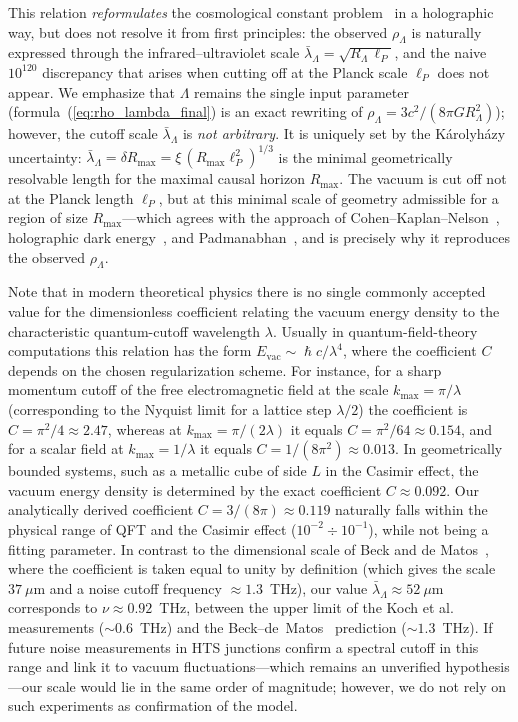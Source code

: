 \documentclass[10pt,a4paper]{article}
\DeclareRobustCommand{\hbar}{\hslash}
\begin{document}
This relation \emph{reformulates} the cosmological constant problem~\cite{Weinberg1989} in a holographic way, but does not resolve it from first principles: the observed $\rho_\Lambda$ is naturally expressed through the infrared--ultraviolet scale $\bar\lambda_\Lambda = \sqrt{R_\Lambda\,\ell_P}$, and the naive $10^{120}$ discrepancy that arises when cutting off at the Planck scale $\ell_P$ does not appear. We emphasize that $\Lambda$ remains the single input parameter (formula~(\ref{eq:rho_lambda_final}) is an exact rewriting of $\rho_\Lambda = 3c^2/(8\pi G R_\Lambda^2)$); however, the cutoff scale $\bar\lambda_\Lambda$ is \emph{not arbitrary}. It is uniquely set by the K\'arolyh\'azy uncertainty: $\bar\lambda_\Lambda = \delta R_{\max} = \xi\,(R_{\max}\ell_P^2)^{1/3}$ is the minimal geometrically resolvable length for the maximal causal horizon $R_{\max}$. The vacuum is cut off not at the Planck length $\ell_P$, but at this minimal scale of geometry admissible for a region of size $R_{\max}$---which agrees with the approach of Cohen--Kaplan--Nelson~\cite{Cohen1999}, holographic dark energy~\cite{Li2004,WangWangLi2017}, and Padmanabhan~\cite{Padmanabhan2005}, and is precisely why it reproduces the observed $\rho_\Lambda$.

Note that in modern theoretical physics there is no single commonly accepted value for the dimensionless coefficient relating the vacuum energy density to the characteristic quantum-cutoff wavelength $\lambda$. Usually in quantum-field-theory computations this relation has the form $E_{\text{vac}} \sim \hbar c / \lambda^4$, where the coefficient $C$ depends on the chosen regularization scheme. For instance, for a sharp momentum cutoff of the free electromagnetic field at the scale $k_{\text{max}} = \pi/\lambda$ (corresponding to the Nyquist limit for a lattice step $\lambda/2$) the coefficient is $C = \pi^2/4 \approx 2.47$, whereas at $k_{\text{max}} = \pi/(2\lambda)$ it equals $C = \pi^2/64 \approx 0.154$, and for a scalar field at $k_{\text{max}} = 1/\lambda$ it equals $C = 1/(8\pi^2) \approx 0.013$. In geometrically bounded systems, such as a metallic cube of side $L$ in the Casimir effect, the vacuum energy density is determined by the exact coefficient $C \approx 0.092$. Our analytically derived coefficient $C = 3/(8\pi) \approx 0.119$ naturally falls within the physical range of QFT and the Casimir effect ($10^{-2} \div 10^{-1}$), while not being a fitting parameter. In contrast to the dimensional scale of Beck and de Matos~\cite{Beck2007}, where the coefficient is taken equal to unity by definition (which gives the scale $37~\mu$m and a noise cutoff frequency $\approx 1.3$~THz), our value $\bar\lambda_\Lambda \approx 52~\mu$m corresponds to $\nu \approx 0.92$~THz, between the upper limit of the Koch et al.~\cite{Koch1982} measurements ($\sim 0.6$~THz) and the Beck--de~Matos~\cite{Beck2007} prediction ($\sim 1.3$~THz). If future noise measurements in HTS junctions confirm a spectral cutoff in this range and link it to vacuum fluctuations---which remains an unverified hypothesis---our scale would lie in the same order of magnitude; however, we do not rely on such experiments as confirmation of the model.
\end{document}
